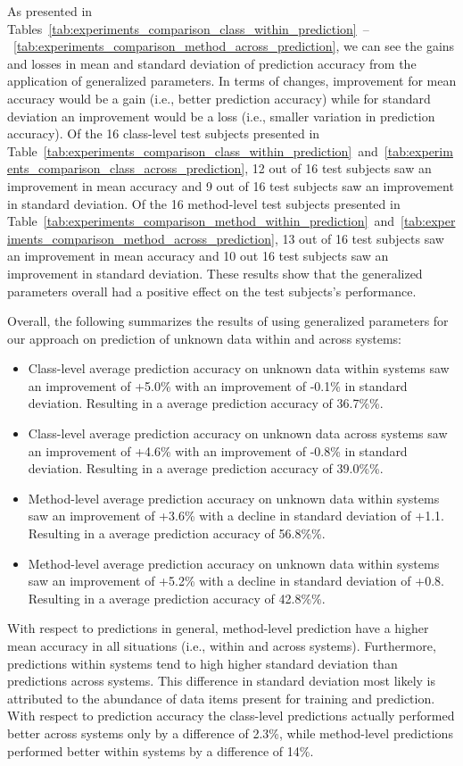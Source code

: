As presented in Tables~\ref{tab:experiments_comparison_class_within_prediction}~--~\ref{tab:experiments_comparison_method_across_prediction}, we can see the gains and losses in mean and standard deviation of prediction accuracy from the application of generalized parameters. In terms of changes, improvement for mean accuracy would be a gain (i.e., better prediction accuracy) while for standard deviation an improvement would be a loss (i.e., smaller variation in prediction accuracy). Of the 16 class-level test subjects presented in Table~\ref{tab:experiments_comparison_class_within_prediction}~and~\ref{tab:experiments_comparison_class_across_prediction}, 12 out of 16 test subjects saw an improvement in mean accuracy and 9 out of 16 test subjects saw an improvement in standard deviation. Of the 16 method-level test subjects presented in Table~\ref{tab:experiments_comparison_method_within_prediction}~and~\ref{tab:experiments_comparison_method_across_prediction}, 13 out of 16 test subjects saw an improvement in mean accuracy and 10 out 16 test subjects saw an improvement in standard deviation. These results show that the generalized parameters overall had a positive effect on the test subjects's performance. 

Overall, the following summarizes the results of using generalized parameters for our approach on prediction of unknown data within and across systems:
\begin{itemize}
  \item Class-level average prediction accuracy on unknown data within systems saw an improvement of +5.0\% with an improvement of -0.1\% in standard deviation. Resulting in a average prediction accuracy of 36.7\%\%.
  \item Class-level average prediction accuracy on unknown data across systems saw an improvement of +4.6\% with an improvement of -0.8\% in standard deviation. Resulting in a average prediction accuracy of 39.0\%\%.
  \item Method-level average prediction accuracy on unknown data within systems saw an improvement of +3.6\% with a decline in standard deviation of +1.1. Resulting in a average prediction accuracy of 56.8\%\%.
  \item Method-level average prediction accuracy on unknown data within systems saw an improvement of +5.2\% with a decline in standard deviation of +0.8. Resulting in a average prediction accuracy of 42.8\%\%.
\end{itemize}
With respect to predictions in general, method-level prediction have a higher mean accuracy in all situations (i.e., within and across systems). Furthermore, predictions within systems tend to high higher standard deviation than predictions across systems. This difference in standard deviation most likely is attributed to the abundance of data items present for training and prediction. With respect to prediction accuracy the class-level predictions actually performed better across systems only by a difference of 2.3\%, while method-level predictions performed better within systems by a difference of 14\%.

